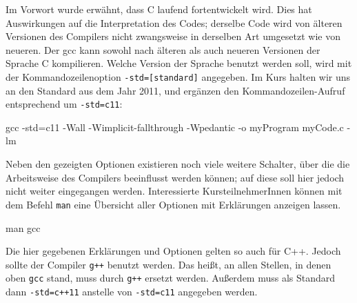 Im Vorwort wurde erwähnt, dass C laufend fortentwickelt wird. Dies hat Auswirkungen auf die Interpretation des Codes; derselbe Code wird von älteren Versionen des Compilers nicht zwangsweise in derselben Art umgesetzt wie von neueren. Der gcc kann sowohl nach älteren als auch neueren Versionen der Sprache C kompilieren. Welche Version der Sprache benutzt werden soll, wird mit der Kommandozeilenoption \texttt{-std=[standard]} angegeben. Im Kurs halten wir uns an den Standard aus dem Jahr 2011, und ergänzen den Kommandozeilen-Aufruf entsprechend um \texttt{-std=c11}:
\begin{cmdbox}
gcc -std=c11 -Wall -Wimplicit-fallthrough -Wpedantic -o myProgram myCode.c -lm
\end{cmdbox}

Neben den gezeigten Optionen existieren noch viele weitere Schalter, über die die Arbeitsweise des Compilers beeinflusst werden können; auf diese soll hier jedoch nicht weiter eingegangen werden. Interessierte KursteilnehmerInnen können mit dem Befehl \texttt{man} eine Übersicht aller Optionen mit Erklärungen anzeigen lassen.
\begin{cmdbox}
man gcc
\end{cmdbox}

\begin{plusbox}
Die hier gegebenen Erklärungen und Optionen gelten so auch für C++. Jedoch sollte der Compiler \texttt{g++} benutzt werden. Das heißt, an allen Stellen, in denen oben \texttt{gcc} stand, muss durch \texttt{g++} ersetzt werden. Außerdem muss als Standard  dann \texttt{-std=c++11} anstelle von \texttt{-std=c11} angegeben werden.
\end{plusbox}

